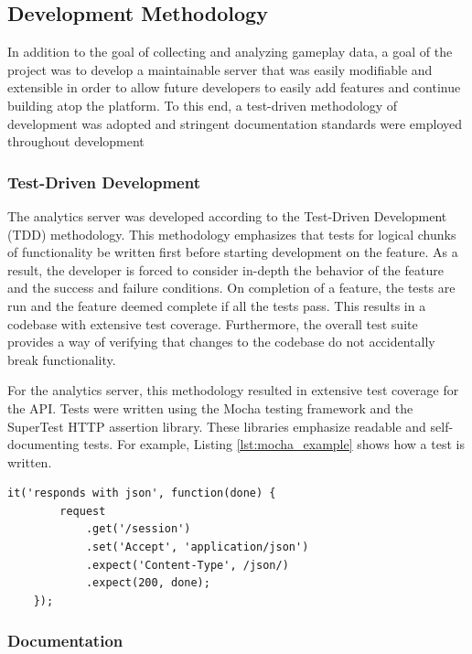 \subsection{Development Methodology}

In addition to the goal of collecting and analyzing gameplay data, a goal of the project was to develop a maintainable server that was easily modifiable and extensible in order to allow future developers to easily add features and continue building atop the platform. To this end, a test-driven methodology of development was adopted and stringent documentation standards were employed throughout development


\subsubsection{Test-Driven Development}

The analytics server was developed according to the Test-Driven Development (TDD) methodology. This methodology emphasizes that tests for logical chunks of functionality be written first before starting development on the feature. As a result, the developer is forced to consider in-depth the behavior of the feature and the success and failure conditions. On completion of a feature, the tests are run and the feature deemed complete if all the tests pass. This results in a codebase with extensive test coverage. Furthermore, the overall test suite provides a way of verifying that changes to the codebase do not accidentally break functionality. 

For the analytics server, this methodology resulted in extensive test coverage for the API. Tests were written using the Mocha testing framework and the SuperTest HTTP assertion library. These libraries emphasize readable and self-documenting tests. For example, Listing \ref{lst:mocha_example} shows how a test is written.

\medskip
\begin{lstlisting}[caption={[Example API Test]Example Mocha test{,} testing that the Session API responds in JSON}, label={lst:mocha_example}]
	it('responds with json', function(done) {
		request
			.get('/session')
			.set('Accept', 'application/json')
			.expect('Content-Type', /json/)
			.expect(200, done);
	});
\end{lstlisting}

\subsubsection{Documentation}


